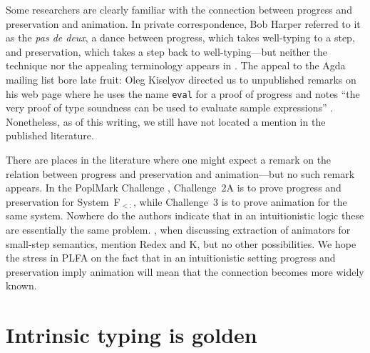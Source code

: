 \documentclass[preprint,authoryear]{elsarticle}
\begin{document}
Some researchers are clearly familiar with the connection between
progress and preservation and animation.  In private correspondence,
Bob Harper referred to it as the \emph{pas de deux}, a dance between
progress, which takes well-typing to a step, and preservation, which
takes a step back to well-typing---but neither the technique
nor the appealing terminology appears in \citet{Harper-2016}.  The
appeal to the Agda mailing list bore late fruit: Oleg Kiselyov
directed us to unpublished remarks on his web page where he uses the
name \texttt{eval} for a proof of progress and notes ``the very proof
of type soundness can be used to evaluate sample expressions''
\citep{Kiselyov-2009}.  Nonetheless, as of this writing, we still have
not located a mention in the published literature.

There are places in the literature where one might expect a remark on
the relation between progress and preservation and animation---but no
such remark appears.  In the PoplMark Challenge
\citep{Aydemir-et-al-2005}, Challenge~2A is to prove progress and
preservation for System~F$_{<:}$, while Challenge~3 is to prove
animation for the same system. Nowhere do the authors indicate that in
an intuitionistic logic these are essentially the same problem.
\cite{Owens-et-al-2016}, when discussing extraction of animators for
small-step semantics, mention Redex and K, but no other possibilities.
We hope the stress in PLFA on the fact that in an intuitionistic
setting progress and preservation imply animation will mean that the
connection becomes more widely known.



\section{Intrinsic typing is golden}
\end{document}
